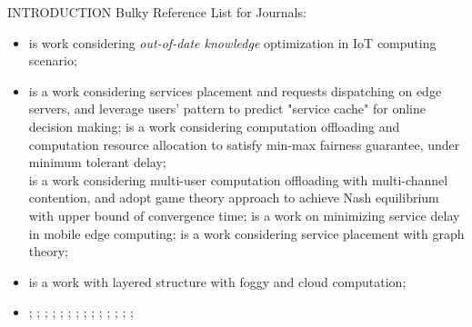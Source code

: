 \documentclass[10pt, conference, letterpaper]{IEEEtran}
\begin{document}
\begin{section}{INTRODUCTION}
        Bulky Reference List for Journals:
        \begin{itemize}
            \item {} \cite{Lyu2017} is work considering \emph{out-of-date knowledge} optimization in IoT computing scenario;
            \item
                \cite{Yang2016} is a work considering services placement and requests dispatching on edge servers, and leverage users' pattern to predict "service cache" for online decision making;
                \cite{Du2018} is a work considering computation offloading and computation resource allocation to satisfy min-max fairness guarantee, under minimum tolerant delay;
                \\
                \cite{Chen2016} is a work considering multi-user computation offloading with multi-channel contention, and adopt game theory approach to achieve Nash equilibrium with upper bound of convergence time;
                \cite{Rodrigues2017} is a work on minimizing service delay in mobile edge computing;
                \cite{Wang2017} is a work considering service placement with graph theory;
            \item \text{[foggy]}
                \cite{Masip-Bruin2016} is a work with layered structure with foggy and cloud computation;
            \item \text{[unfinished]}
                \cite{Fan2017}; \cite{Lyu2018}; \cite{Lyu2018a}; \cite{Chen2018}; \cite{Yu2018}; \cite{Zhang2018}; \cite{Wang2018}; \cite{Josilo2019}; \cite{Chen2018a}; \cite{Sthapit2018}; \cite{Naha2018}; \cite{Dinh2018}; \cite{Lyu2018b}; \cite{Garcia-Saavedra2018};
        \end{itemize}

    \end{section}
\end{document}
